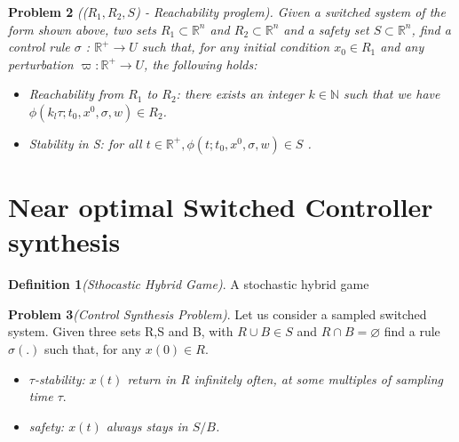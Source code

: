 
 \textbf{Problem 2} \emph{((${R_1,R_2,S}$) - Reachability proglem).
  Given a switched system of the form shown above, two sets  
  ${ R_1 \subset \mathbb{R}^n}$  and ${ R_2 \subset \mathbb{R}^n}$ 
 and a safety set  ${S \subset  \mathbb{R}^n}$, find a control rule 
 ${\sigma}$ :
  ${\mathbb{R}^+\rightarrow U}$ such that, for any initial condition 
  ${x_0  \in  R_1}$ and any perturbation  ${\varpi : \mathbb{R}^+  
  \rightarrow U}$, the following holds:}
 
 \begin{itemize}
    \item  \emph{Reachability from ${R_1}$ to ${R_2}$: there exists 
    an integer ${k \in \mathbb{N} }$ such that we have ${ \phi( k_l\tau
    ;t_0,x^0,\sigma,w) \in R_2 }$.}
    
    \item \emph{ Stability in S: for all ${ t \in \mathbb{R}^+, 
    \phi(t;t_0,x^0,\sigma,w) \in S}$ .}
\end{itemize}
 
\section{Near optimal Switched Controller synthesis}

\textbf{Definition 1}\emph{(Sthocastic Hybrid Game)}. A stochastic
 hybrid game 
 
\textbf{Problem 3}\emph{(Control Synthesis Problem)}. Let us 
consider a sampled switched system. Given three sets R,S and B, 
with ${R \cup B \in S}$  and ${R \cap B = \varnothing }$ find a 
rule ${\sigma(.)}$ such that, for any ${x(0) \in R }$. 

\begin{itemize}
    \item \emph{ ${\tau}$-stability: ${x(t)}$ return in R 
    infinitely often, at some multiples of sampling time ${\tau}$}.
    \item \emph{ safety: ${x(t)}$ always stays in ${S/B}$.}
\end{itemize}




